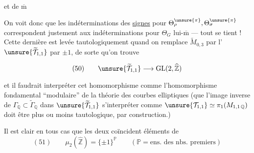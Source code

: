 et de $\overline{\mathrm m}$ 

On voit donc que les indéterminations des \uline{signes} pour
$\Theta_{\rho}^{\unsure{\pi}},\Theta_{\sigma}^{\unsure{\pi}}$
correspondent justement aux indéterminations pour $\Theta_G$
lui-$\overline{\mathrm m}$ --- tout se tient ! Cette dernière est levée
 tautologiquement quand on remplace
$\widetilde M_{0,3}$ par l'
 $\unsure{\widetilde{\mathcal T}_{1,1}}$ par $\pm1$,
de sorte qu'on trouve

\[
(50)\qquad \unsure{\widetilde{\mathcal T}_{1,1}}
\longrightarrow \mathrm{GL}(2,\widehat{\mathbb Z})
\]

et il faudrait  interpréter cet homomorphisme
comme l'homomorphisme fondamental ``modulaire'' de la théorie des courbes
elliptiques (que l'image inverse de \deleted{$\unsure{\Gamma}$}
$\Gamma_{\mathbb Q}\subset\widetilde\Gamma_{\mathbb Q}$ dans
$\unsure{\widetilde{\mathcal T}_{1,1}}$  s'interpréter comme
$\unsure{\mathcal T_{1,1}}\simeq\pi_1(M_{1,1\,\mathbb Q})$
doit être plus ou moins tautologique, par construction.)

Il est clair en tous cas que les deux coïncident
  éléments de
\[
(51)\qquad \mu_2(\widehat{\mathbb Z})=\{\pm1\}^{\mathbb P}
\qquad (\mathbb P=\text{ens. des nbs. premiers})
\]

